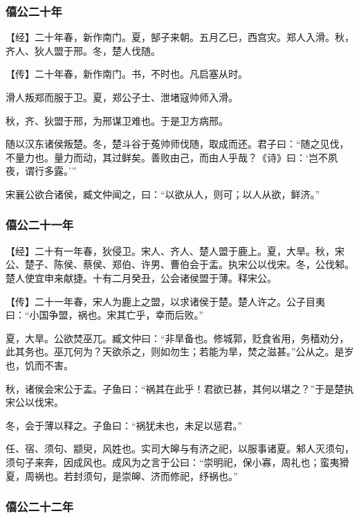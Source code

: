 \documentclass[]{article}
\begin{document}
\hypertarget{header-n859}{%
\subsubsection{僖公二十年}\label{header-n859}}

【经】二十年春，新作南门。夏，郜子来朝。五月乙巳，西宫灾。郑人入滑。秋，齐人、狄人盟于邢。冬，楚人伐随。

【传】二十年春，新作南门。书，不时也。凡启塞从时。

滑人叛郑而服于卫。夏，郑公子士、泄堵寇帅师入滑。

秋，齐、狄盟于邢，为邢谋卫难也。于是卫方病邢。

随以汉东诸侯叛楚。冬，楚斗谷于菟帅师伐随，取成而还。君子曰：``随之见伐，不量力也。量力而动，其过鲜矣。善败由己，而由人乎哉？《诗》曰：`岂不夙夜，谓行多露。'''

宋襄公欲合诸侯，臧文仲闻之，曰：``以欲从人，则可；以人从欲，鲜济。''

\hypertarget{header-n868}{%
\subsubsection{僖公二十一年}\label{header-n868}}

【经】二十有一年春，狄侵卫。宋人、齐人、楚人盟于鹿上。夏，大旱。秋，宋公、楚子、陈侯、蔡侯、郑伯、许男、曹伯会于盂。执宋公以伐宋。冬，公伐邾。楚人使宜申来献捷。十有二月癸丑，公会诸侯盟于薄。释宋公。

【传】二十一年春，宋人为鹿上之盟，以求诸侯于楚。楚人许之。公子目夷曰：``小国争盟，祸也。宋其亡乎，幸而后败。''

夏，大旱。公欲焚巫兀。臧文仲曰：``非旱备也。修城郭，贬食省用，务穑劝分，此其务也。巫兀何为？天欲杀之，则如勿生；若能为旱，焚之滋甚。''公从之。是岁也，饥而不害。

秋，诸侯会宋公于盂。子鱼曰：``祸其在此乎！君欲已甚，其何以堪之？''于是楚执宋公以伐宋。

冬，会于薄以释之。子鱼曰：``祸犹未也，未足以惩君。''

任、宿、须句、颛臾，风姓也。实司大皞与有济之祀，以服事诸夏。邾人灭须句，须句子来奔，因成风也。成风为之言于公曰：``崇明祀，保小寡，周礼也；蛮夷猾夏，周祸也。若封须句，是崇皞、济而修祀，纾祸也。''

\hypertarget{header-n877}{%
\subsubsection{僖公二十二年}\label{header-n877}}
\end{document}
